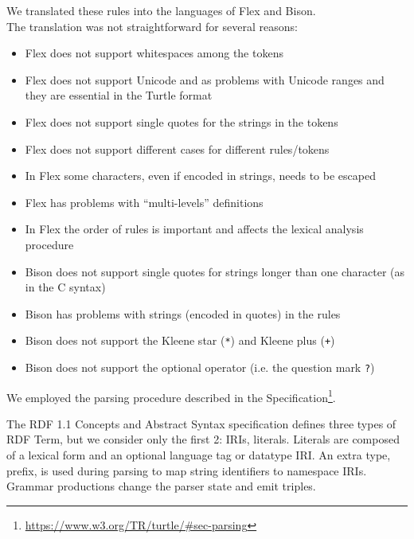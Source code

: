 \documentclass[oneside]{book}
\begin{document}
We translated these rules into the languages of Flex and Bison.\\
The translation was not straightforward for several reasons:
\begin{itemize}
	\item Flex does not support whitespaces among the tokens
	\item Flex does not support Unicode and as problems with Unicode ranges and they are essential in the Turtle format
	\item Flex does not support single quotes for the strings in the tokens
	\item Flex does not support different cases for different rules/tokens
	\item In Flex some characters, even if encoded in strings, needs to be escaped
	\item Flex has problems with “multi-levels” definitions
	\item In Flex the order of rules is important and affects the lexical analysis procedure
	\item Bison does not support single quotes for strings longer than one character (as in the C syntax)
	\item Bison has problems with strings (encoded in quotes) in the rules
	\item Bison does not support the Kleene star (\texttt{*}) and Kleene plus (\texttt{+})
	\item Bison does not support the optional operator (i.e. the question mark \texttt{?})
\end{itemize}

We employed the parsing procedure described in the Specification\footnote{\url{https://www.w3.org/TR/turtle/\#sec-parsing}}.

The RDF 1.1 Concepts and Abstract Syntax specification defines three types of RDF Term, but we consider only the first 2: IRIs, literals. Literals are composed of a lexical form and an optional language tag or datatype IRI. An extra type, prefix, is used during parsing to map string identifiers to namespace IRIs. Grammar productions change the parser state and emit triples.
\end{document}

